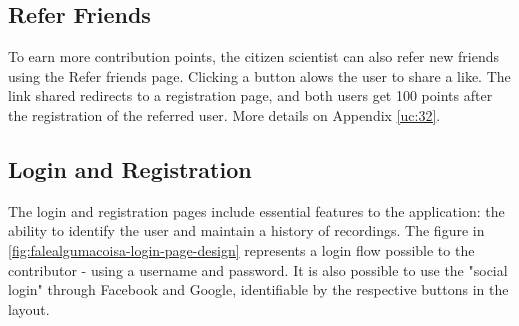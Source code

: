 \subsection{Refer Friends}

To earn more contribution points, the citizen scientist can also refer new friends using the Refer friends page. Clicking a button alows the user to share a like. The link shared redirects to a registration page, and both users get 100 points after the registration of the referred user. More details on Appendix \ref{uc:32}.

\subsection{Login and Registration}

The login and registration pages include essential features to the application: the ability to identify the user and maintain a history of recordings. The figure in \ref{fig:falealgumacoisa-login-page-design} represents a login flow possible to the contributor - using a username and password. It is also possible to use the "social login" through Facebook and Google, identifiable by the respective buttons in the layout.

